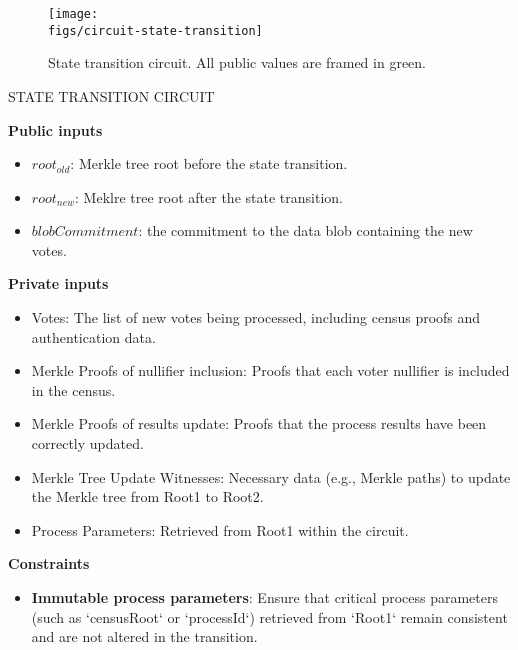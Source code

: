 \begin{figure}[H]
	\centerline{\texttt{[image: \\figs/circuit-state-transition]}}
	\caption{State transition circuit. All public values are framed in green.}
	\label{fig:circuit-state-transition}
\end{figure}

\begin{mdframed}
	\begin{minipage}[H]{1\textwidth}
		\begin{spacing}{1.25}
			\vspace{0.3cm}
			\begin{center}{STATE TRANSITION CIRCUIT}\end{center}
			\textbf{Public inputs}
			\begin{itemize}
				\item \public $root_{old}$: Merkle tree root before the state transition.
				\item \public $root_{new}$: Meklre tree root after the state transition.
				\item \public $blobCommitment$: the commitment to the data blob containing the new votes.
				\end{itemize}
				\item \textbf{Private inputs}
				\begin{itemize}
				\item \private Votes: The list of new votes being processed, including census proofs and authentication data.
				\item \private Merkle Proofs of nullifier inclusion: Proofs that each voter nullifier is included in the census.
				\item \private Merkle Proofs of results update: Proofs that the process results have been correctly updated.
				\item \private Merkle Tree Update Witnesses: Necessary data (e.g., Merkle paths) to update the Merkle tree from Root1 to Root2.
				\item \private Process Parameters: Retrieved from Root1 within the circuit.
			\end{itemize}
			\textbf{Constraints} \\ \vspace{-0.4cm}		
			\begin{itemize}
				\item \textbf{Immutable process parameters}: Ensure that critical process parameters (such as `censusRoot` or `processId`) retrieved from `Root1` remain consistent and are not altered in the transition.

\end{itemize}
\end{spacing}
\end{minipage}
\end{mdframed}

